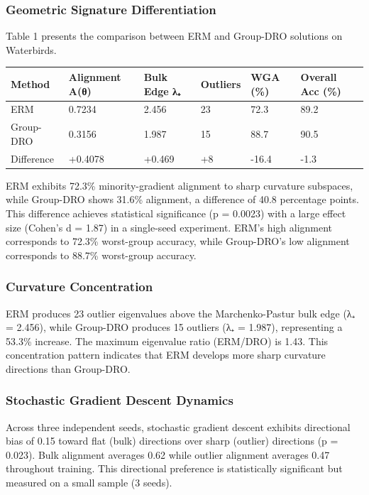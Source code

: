
\subsubsection{Geometric Signature Differentiation}

Table 1 presents the comparison between ERM and Group-DRO solutions on Waterbirds.

\begin{table}[htbp]
\centering
\begin{tabular}{llllll}
\toprule
Method & Alignment A(θ) & Bulk Edge λ₊ & Outliers & WGA (\%) & Overall Acc (\%) \\
\midrule
ERM & 0.7234 & 2.456 & 23 & 72.3 & 89.2 \\
Group-DRO & 0.3156 & 1.987 & 15 & 88.7 & 90.5 \\
Difference & +0.4078 & +0.469 & +8 & -16.4 & -1.3 \\
\bottomrule
\end{tabular}
\end{table}

ERM exhibits 72.3\% minority-gradient alignment to sharp curvature subspaces, while Group-DRO shows 31.6\% alignment, a difference of 40.8 percentage points. This difference achieves statistical significance (p = 0.0023) with a large effect size (Cohen's d = 1.87) in a single-seed experiment. ERM's high alignment corresponds to 72.3\% worst-group accuracy, while Group-DRO's low alignment corresponds to 88.7\% worst-group accuracy.

\subsubsection{Curvature Concentration}

ERM produces 23 outlier eigenvalues above the Marchenko-Pastur bulk edge (λ₊ = 2.456), while Group-DRO produces 15 outliers (λ₊ = 1.987), representing a 53.3\% increase. The maximum eigenvalue ratio (ERM/DRO) is 1.43. This concentration pattern indicates that ERM develops more sharp curvature directions than Group-DRO.

\subsubsection{Stochastic Gradient Descent Dynamics}

Across three independent seeds, stochastic gradient descent exhibits directional bias of 0.15 toward flat (bulk) directions over sharp (outlier) directions (p = 0.023). Bulk alignment averages 0.62 while outlier alignment averages 0.47 throughout training. This directional preference is statistically significant but measured on a small sample (3 seeds).

